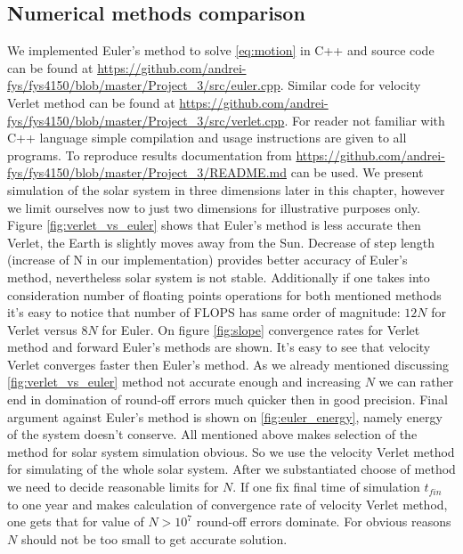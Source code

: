 \documentclass[10pt]{article}
\begin{document}
\subsection{Numerical methods comparison}
We implemented Euler's method to solve \ref{eq:motion} in C++ and source code can be found at \url{https://github.com/andrei-fys/fys4150/blob/master/Project_3/src/euler.cpp}. Similar code for velocity Verlet method can be found at \url{https://github.com/andrei-fys/fys4150/blob/master/Project_3/src/verlet.cpp}. For reader not familiar with C++ language simple compilation and usage instructions are given to all programs. To reproduce results documentation from \url{https://github.com/andrei-fys/fys4150/blob/master/Project_3/README.md} can be used.
We present simulation of the solar system in three dimensions later in this chapter, however  we limit ourselves now to just two  dimensions for illustrative purposes only. 
Figure \ref{fig:verlet_vs_euler} shows that Euler's method is less accurate then Verlet, the Earth is slightly moves away from the Sun. Decrease of step length (increase of N in our implementation) provides better accuracy of Euler's method, nevertheless solar system is not stable. Additionally if one takes into consideration number of floating points operations for both mentioned methods it's easy to notice that number of FLOPS has same order of magnitude: $12N$ for Verlet versus $8N$ for Euler. On figure \ref{fig:slope} convergence rates for Verlet method and forward Euler's methods are shown. It's easy to see that velocity Verlet converges faster then Euler's method. As we already mentioned discussing \ref{fig:verlet_vs_euler} method not accurate enough and increasing $N$ we can rather end in domination of round-off errors much quicker then in good precision. Final argument against Euler's method is shown on \ref{fig:euler_energy}, namely energy of the system doesn't conserve. All mentioned above makes selection of the method for solar system simulation obvious. So we use the velocity Verlet method for simulating of the whole solar system. After we substantiated choose of method we need to decide reasonable limits for $N$. If one fix final time of simulation $t_{fin}$ to one year and makes calculation of convergence rate of velocity Verlet method, one gets that for value of $N > 10^7$ round-off errors dominate. For obvious reasons $N$ should not be too small to get accurate solution.

\clearpage
\end{document}
